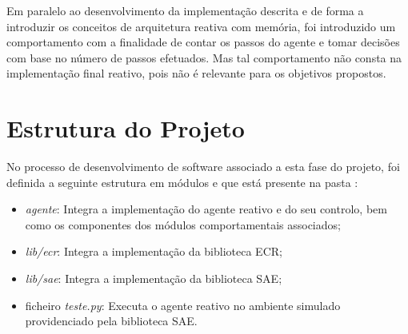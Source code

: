 Em paralelo ao desenvolvimento da implementação descrita e de forma a introduzir os conceitos de arquitetura reativa com memória, foi introduzido um comportamento com a finalidade de contar os passos do agente e tomar decisões com base no número de passos efetuados.
Mas tal comportamento não consta na implementação final reativo, pois não é relevante para os objetivos propostos.


\section{Estrutura do Projeto}\label{sec:estrutura-projeto}

No processo de desenvolvimento de software associado a esta fase do projeto, foi definida a seguinte estrutura em módulos e que está presente na pasta :

\begin{itemize}
    \item \textit{agente}: Integra a implementação do agente reativo e do seu controlo, bem como os componentes dos módulos comportamentais associados;
    \item \textit{lib/ecr}: Integra a implementação da biblioteca ECR;
    \item \textit{lib/sae}: Integra a implementação da biblioteca SAE;
    \item ficheiro \textit{teste.py}: Executa o agente reativo no ambiente simulado providenciado pela biblioteca SAE.
\end{itemize}
